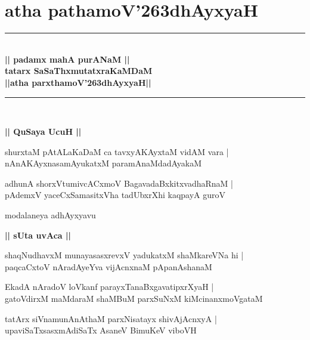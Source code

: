 \documentclass[twoside,12pt,openright]{book}
\def\S{\char'263}
\newcounter{shloka}[chapter]
\def\uvaca#1{\centerline{{\large\textbf{#1}}}}
\begin{document}

\frontmatter

\tableofcontents

\mainmatter
\begin{center}

\end{center}
\chapter{atha pathamoV\S dhAyxyaH}
\begin{center}
\rule{2cm}{1pt}\\[.5cm]
{\huge\bfseries || padamx mahA purANaM ||}\\[.3cm]
{\Large\bfseries  tatarx SaSaThxmutatxraKaMDaM }\\[.3cm]
{\LARGE\bfseries ||atha parxthamoV\S dhAyxyaH||}\\[.3cm]
\rule{2cm}{1pt}\\
\end{center}
\uvaca{|| QuSaya UcuH ||}

\begin{shloka}%
shurxtaM pAtALaKaDaM ca tavxyAKAyxtaM vidAM vara |\\
nAnAKAyxnasamAyukatxM paramAnaMdadAyakaM
\end{shloka}

\begin{shloka}%
adhunA shorxVtumivcACxmoV BagavadaBxkitxvadhaRnaM |\\
pAdemxV yaceCxSamasitxVha tadUbxrXhi kaqpayA guroV 
\end{shloka}

\begin{center}
modalaneya adhAyxyavu
\end{center}

\uvaca{|| sUta uvAca ||}

\begin{shloka}%
shaqNudhavxM munayasasxrevxV yadukatxM shaMkareVNa hi |\\
paqcaCxtoV nAradAyeYva vijAcnxnaM pApanAshanaM 
\end{shloka}

\begin{shloka}%
EkadA nAradoV loVkanf parayxTanaBxgavatipxrXyaH |\\
gatoVdirxM maMdaraM shaMBuM parxSuNxM kiMcinanxmoVgataM 
\end{shloka}

\begin{shloka}%
tatArx siVnamunAnAthaM parxNisatayx shivAjAcnxyA |\\
upaviSaTxsasxmAdiSaTx AsaneV BimuKeV viboVH
\end{shloka}
\end{document}
